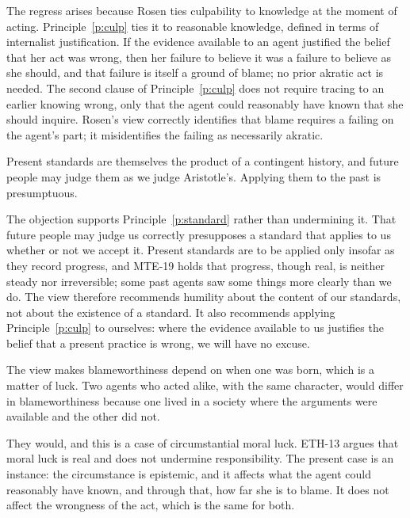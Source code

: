\documentclass{situationist-preprint}
\begin{document}
\begin{reply}
The regress arises because Rosen ties culpability to knowledge at the moment of acting. Principle~\ref{p:culp} ties it to reasonable knowledge, defined in terms of internalist justification. If the evidence available to an agent justified the belief that her act was wrong, then her failure to believe it was a failure to believe as she should, and that failure is itself a ground of blame; no prior akratic act is needed. The second clause of Principle~\ref{p:culp} does not require tracing to an earlier knowing wrong, only that the agent could reasonably have known that she should inquire. Rosen's view correctly identifies that blame requires a failing on the agent's part; it misidentifies the failing as necessarily akratic.
\end{reply}

\begin{objection}
Present standards are themselves the product of a contingent history, and future people may judge them as we judge Aristotle's. Applying them to the past is presumptuous.
\end{objection}

\begin{reply}
The objection supports Principle~\ref{p:standard} rather than undermining it. That future people may judge us correctly presupposes a standard that applies to us whether or not we accept it. Present standards are to be applied only insofar as they record progress, and MTE-19 holds that progress, though real, is neither steady nor irreversible; some past agents saw some things more clearly than we do. The view therefore recommends humility about the content of our standards, not about the existence of a standard. It also recommends applying Principle~\ref{p:culp} to ourselves: where the evidence available to us justifies the belief that a present practice is wrong, we will have no excuse.
\end{reply}

\begin{objection}
The view makes blameworthiness depend on when one was born, which is a matter of luck. Two agents who acted alike, with the same character, would differ in blameworthiness because one lived in a society where the arguments were available and the other did not.
\end{objection}

\begin{reply}
They would, and this is a case of circumstantial moral luck. ETH-13 argues that moral luck is real and does not undermine responsibility. The present case is an instance: the circumstance is epistemic, and it affects what the agent could reasonably have known, and through that, how far she is to blame. It does not affect the wrongness of the act, which is the same for both.
\end{reply}
\end{document}
